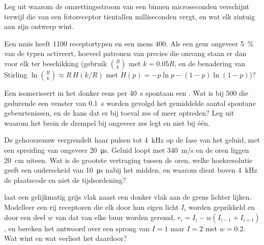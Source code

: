 \begin{exercise}[$\star\star$]\label{exo:b3:sensory-systems:8}
Leg uit waarom de omzettingsstroom van een  binnen microseconden
verschijnt terwijl die van een fotoreceptor tientallen milliseconden
vergt, en wat elk zintuig aan zijn ontwerp wint.
\end{exercise}

\begin{exercise}[$\star\star$]\label{exo:b3:sensory-systems:9}
Een muis heeft \num{1100} receptortypen en een mens $400$. Als een geur
ongeveer \qty{5}{\%} van de typen activeert, hoeveel patronen van
precies die omvang staan er dan voor elk ter beschikking (gebruik
$\binom{R}{k}$ met $k = 0.05R$, en de benadering van Stirling
$\ln\binom{R}{k} \approx R\,H(k/R)$ met
$H(p) = -p\ln p - (1-p)\ln(1-p)$)?
\end{exercise}

\begin{exercise}[$\star\star\star$]\label{exo:b3:sensory-systems:10}
Een  isomeriseert in het donker eens per \qty{40}{s} spontaan
een . Wat is bij $500$  die gedurende een venster van
\qty{0.1}{s} worden gevolgd het gemiddelde aantal spontane
gebeurtenissen, en de kans dat er bij toeval zes of meer optreden? Leg
uit waarom het brein de drempel bij ongeveer zes legt en niet bij één.
\end{exercise}

\begin{exercise}[$\star\star\star$]\label{exo:b3:sensory-systems:11}
De gehoorzenuw vergrendelt haar pulsen tot \qty{4}{kHz} op de fase van
het geluid, met een spreiding van ongeveer \qty{20}{\micro s}. Geluid
loopt met \qty{340}{m/s} en de oren liggen \qty{20}{cm} uiteen. Wat is
de grootste vertraging tussen de oren, welke hoekresolutie geeft een
onderscheid van \qty{10}{\micro s} nabij het midden, en waarom dient
boven \qty{4}{kHz} de plaatscode en niet de tijdsordening?
\end{exercise}

\begin{exercise}[$\star\star\star$]\label{exo:b3:sensory-systems:12}
 laat een gelijkmatig grijs vlak naast een donker vlak
aan de grens lichter lijken. Modelleer een rij receptoren die elk door
hun eigen licht $I_{i}$ worden geprikkeld en door een deel $w$ van dat
van elke buur worden geremd,
$r_{i} = I_{i} - w(I_{i-1} + I_{i+1})$, en bereken het antwoord over
een sprong van $I = 1$ naar $I = 2$ met $w = 0.2$. Wat wint en wat
verliest het  daardoor?
\end{exercise}

